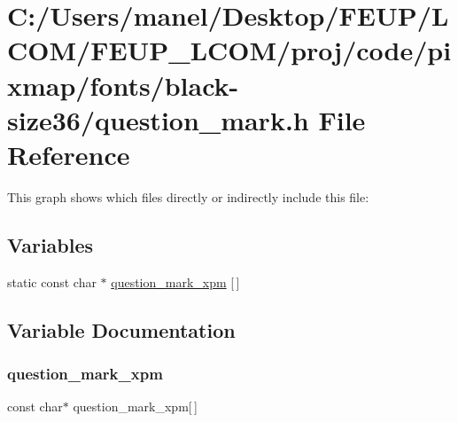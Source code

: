 \hypertarget{black-size36_2question__mark_8h}{}\section{C\+:/\+Users/manel/\+Desktop/\+F\+E\+U\+P/\+L\+C\+O\+M/\+F\+E\+U\+P\+\_\+\+L\+C\+O\+M/proj/code/pixmap/fonts/black-\/size36/question\+\_\+mark.h File Reference}
\label{black-size36_2question__mark_8h}
This graph shows which files directly or indirectly include this file\+:
\subsection*{Variables}
\begin{DoxyCompactItemize}
\item 
static const char $\ast$ \mbox{\hyperlink{black-size36_2question__mark_8h_a06319aa5bfded1f76f2cf433e18bd02b}{question\+\_\+mark\+\_\+xpm}} \mbox{[}$\,$\mbox{]}
\end{DoxyCompactItemize}


\subsection{Variable Documentation}
\mbox{\label{black-size36_2question__mark_8h_a06319aa5bfded1f76f2cf433e18bd02b}} 
\subsubsection{\texorpdfstring{question\_mark\_xpm}{question\_mark\_xpm}}
{\footnotesize\ttfamily const char$\ast$ question\+\_\+mark\+\_\+xpm\mbox{[}$\,$\mbox{]}\hspace{0.3cm}{\ttfamily [static]}}

